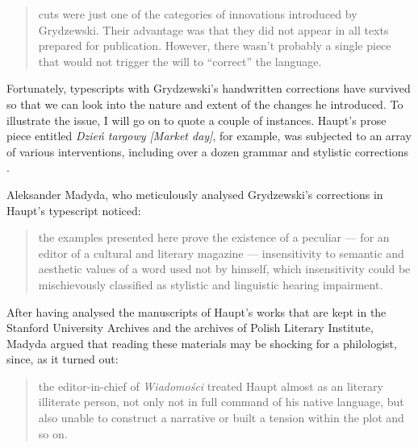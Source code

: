 \begin{paper}
\begin{quote}
cuts were just one of the categories of innovations introduced by
Grydzewski. Their advantage was that they did not appear in all texts
prepared for publication. However, there wasn't probably a single piece
that would not trigger the will to ``correct'' the language.
\begin{flushright}
\citep[220]{madyda_od_2015}
\end{flushright}
\end{quote}

\noindent Fortunately, typescripts with Grydzewski's handwritten
corrections have survived so that we can look into the nature and extent
of the changes he introduced. To illustrate the issue, I will go on to quote a couple of
instances. Haupt's prose piece entitled \emph{Dzień targowy
[Market day]}, for example, was subjected to an array of various interventions, including over a dozen grammar and stylistic corrections \citep[222]{madyda_od_2015}.

Aleksander Madyda, who meticulously analysed Grydzewski's corrections in
Haupt's typescript noticed: 

\begin{quote}
the examples presented here prove the
existence of a peculiar --- for an editor of a cultural and literary
magazine --- insensitivity to semantic and aesthetic values of a word
used not by himself, which insensitivity could be mischievously
classified as stylistic and linguistic hearing impairment.
\begin{flushright}
\citep[226]{madyda_od_2015}
\end{flushright}
\end{quote}

\noindent After having analysed the manuscripts of Haupt's works that are kept in the Stanford University
Archives and the archives of Polish Literary Institute, Madyda argued
that reading these materials may be shocking for a philologist, since,
as it turned out: 

\begin{quote}
the editor-in-chief of \emph{Wiadomości} treated
Haupt almost as an literary illiterate person, not only not in full
command of his native language, but also unable to construct a narrative
or built a tension within the plot and so on.
\begin{flushright}
\citep[228]{madyda_krytyka_1995}
\end{flushright}
\end{quote}


\end{paper}
